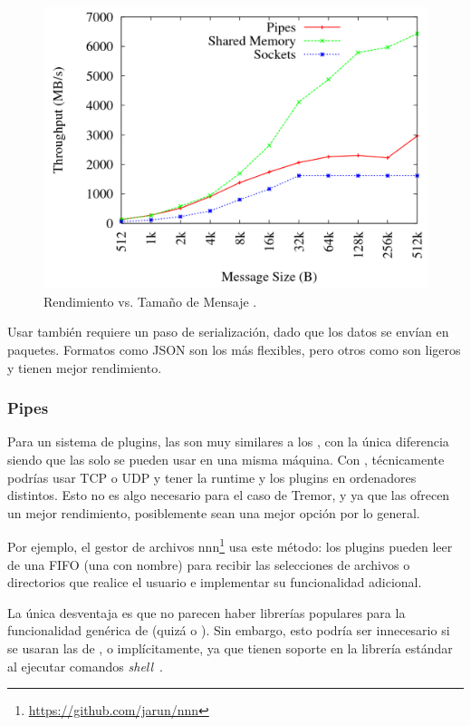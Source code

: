 \begin{figure}
    \centering
    \includegraphics[width=12cm]{./Imagenes/venkataraman2015evaluation2.png}
    \caption{Rendimiento vs. Tamaño de Mensaje
    \cite{venkataraman2015evaluation}.}%
    \label{fig:ipc_comparison2}
\end{figure}

Usar \sockets también requiere un paso de serialización, dado que los datos se
envían en paquetes. Formatos como JSON son los más flexibles, pero otros como
\textcite{protobuf} son ligeros y tienen mejor rendimiento.

\subsubsection{Pipes}

Para un sistema de plugins, las \pipes son muy similares a los \sockets, con la
única diferencia siendo que las \pipes solo se pueden usar en una misma máquina.
Con \sockets, técnicamente podrías usar TCP o UDP y tener la runtime y los
plugins en ordenadores distintos. Esto no es algo necesario para el caso de
Tremor, y ya que las \pipes ofrecen un mejor rendimiento, posiblemente sean una
mejor opción por lo general.

Por ejemplo, el gestor de archivos
nnn\footnote{\url{https://github.com/jarun/nnn}} usa este método: los plugins
pueden leer de una FIFO (una \pipe con nombre) para recibir las selecciones de
archivos o directorios que realice el usuario e implementar su funcionalidad
adicional.

La única desventaja es que no parecen haber librerías populares para la
funcionalidad genérica de \pipes (quizá  o
). Sin embargo, esto podría ser innecesario si se usaran las
\pipes de \stdin, \stdout o \stderr implícitamente, ya que tienen soporte en la
librería estándar al ejecutar comandos \emph{shell}~\cite{rustpipes}.

